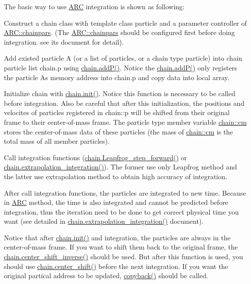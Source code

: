 The basic way to use \hyperlink{namespaceARC}{A\+RC} integration is shown as following\+:
\begin{DoxyEnumerate}
\item Construct a chain class with template class particle and a parameter controller of \hyperlink{classARC_1_1chainpars}{A\+R\+C\+::chainpars}. (The \hyperlink{classARC_1_1chainpars}{A\+R\+C\+::chainpars} should be configured first before doing integration. see its document for detail).
\item Add existed particle \textquotesingle{}A\textquotesingle{} (or a list of particles, or a chain type particle) into chain particle list chain.\+p using \hyperlink{classARC_1_1chain_a0f91c399beb1e5c0db6ed7e2b4d00477}{chain.\+add\+P()}. Notice the \hyperlink{classARC_1_1chain_a0f91c399beb1e5c0db6ed7e2b4d00477}{chain.\+add\+P()} only registers the particle A\textquotesingle{}s memory address into chain.\+p and copy data into local array.
\item Initialize chain with \hyperlink{classARC_1_1chain_a0ad6c0c1d80133d8a4d62bc4679cef80}{chain.\+init()}. Notice this function is necessary to be called before integration. Also be careful that after this initialization, the positions and velocites of particles registered in chain\+::p will be shifted from their original frame to their center-\/of-\/mass frame. The particle type member variable \hyperlink{classARC_1_1chain_ae9f6a5cbf7aac2b33c7274e7e10916ed}{chain\+::cm} stores the center-\/of-\/mass data of these particles (the mass of \hyperlink{classARC_1_1chain_ae9f6a5cbf7aac2b33c7274e7e10916ed}{chain\+::cm} is the total mass of all member particles).
\item Call integration functions (\hyperlink{classARC_1_1chain_a991a386117bf0597a46cba3b7f356978}{chain.\+Leapfrog\+\_\+step\+\_\+forward()} or \hyperlink{classARC_1_1chain_af8f59f60d18fff66ef7102a74b4a8838}{chain.\+extrapolation\+\_\+integration()}). The former use only Leapfrog method and the latter use extrapolation method to obtain high accuracy of integration.
\item After call integration functions, the particles are integrated to new time. Because in \hyperlink{namespaceARC}{A\+RC} method, the time is also integrated and cannot be predicted before integration, thus the iteration need to be done to get correct physical time you want (see detailed in \hyperlink{classARC_1_1chain_af8f59f60d18fff66ef7102a74b4a8838}{chain.\+extrapolation\+\_\+integration()} document).
\item Notice that after \hyperlink{classARC_1_1chain_a0ad6c0c1d80133d8a4d62bc4679cef80}{chain.\+init()} and integration, the particles are always in the center-\/of-\/mass frame. If you want to shift them back to the original frame, the \hyperlink{classARC_1_1chain_a52edc1843550578f5be5590b7403ef97}{chain.\+center\+\_\+shift\+\_\+inverse()} should be used. But after this function is used, you should use \hyperlink{classARC_1_1chain_a68ae268afb418455bfdd6e8101b3b4eb}{chain.\+center\+\_\+shift()} before the next integration. If you want the original partical address to be updated, \hyperlink{classARC_1_1chain_a780fe41b768a5f8821ea799dae8b3d10}{copyback()} should be called.
\end{DoxyEnumerate}

